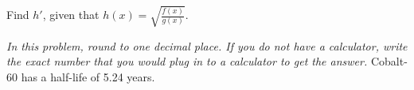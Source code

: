\documentclass[12pt, addpoints]{exam/exam}
\newcommand{\1}{^{-1}}
\theoremstyle{plain}
\begin{document}
\begin{questions}
\begin{multicols}{2}
\end{multicols}

\question[2]%
Find $h'$, given that $h(x)=\sqrt{\frac{f(x)}{g(x)}}$.
\vspace{3pc}


\question%
\textit{In this problem, round to one decimal place.  If you do not have a calculator, write the exact number that you would plug in to a calculator to get the answer.}  Cobalt-60 has a half-life of 5.24 years.
\end{questions}
\end{document}
